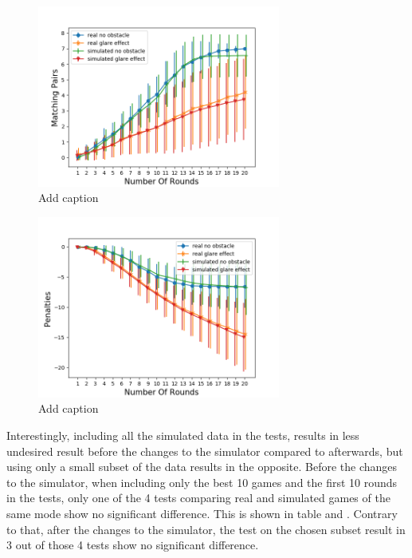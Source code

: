 \begin{minipage}{0.5\textwidth}
	\begin{figure}[H]
		\centering
		\includegraphics[width=8cm]{images/sd10x/Figure_3.png}
		\caption[Bild kurz]{Add caption}
		\label{fig:simOp101}
	\end{figure}
\end{minipage}
\begin{minipage}{0.5\textwidth}
	\begin{figure}[H]
		\centering
		\includegraphics[width=8cm]{images/sd10x/Figure_4.png}
		\caption[Bild kurz]{Add caption}
		\label{fig:simOp102}
	\end{figure}
\end{minipage} 

Interestingly, including all the simulated data in the tests, results in less undesired result before the changes to the simulator compared to afterwards, but using only a small subset of the data results in the opposite. Before the changes to the simulator, when including only the best 10 games and the first 10 rounds in the tests, only one of the 4 tests comparing real and simulated games of the same mode show no significant difference. This is shown in table  and . Contrary to that, after the changes to the simulator, the test on the chosen subset result in 3 out of those 4 tests show no significant difference. 

